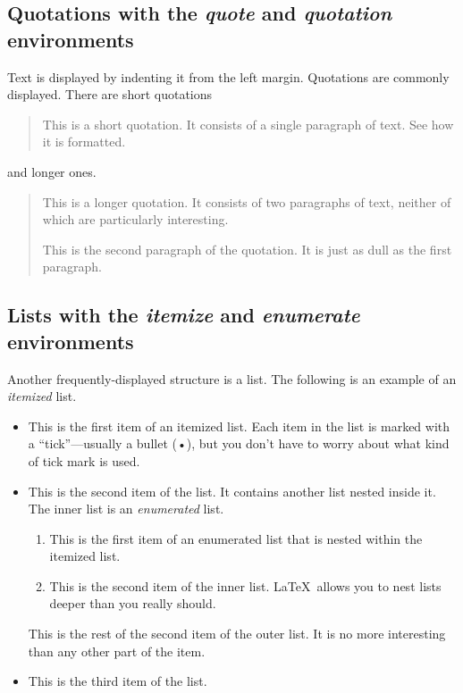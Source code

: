 \documentclass{article}      %
\begin{document}
\subsection{Quotations with the \emph{quote} and \emph{quotation} environments}

Text is displayed by indenting it from the left margin.  Quotations are commonly displayed.  There
are short quotations
\begin{quote}
   This is a short quotation.  It consists of a single paragraph of text.  See how it is formatted.
\end{quote}
and longer ones.
\begin{quotation}
   This is a longer quotation.  It consists of two paragraphs of text, neither of which are
   particularly interesting.

   This is the second paragraph of the quotation.  It is just as dull as the first paragraph.
\end{quotation}

\subsection{Lists with the \emph{itemize} and \emph{enumerate} environments}

Another frequently-displayed structure is a list. The following is an example of an 
\emph{itemized} list.

\begin{itemize}
   
   \item This is the first item of an itemized list. Each item in the list is marked with a
    ``tick''—usually a bullet (•), but you don't have to worry about what kind of tick mark is
    used.

   \item This is the second item of the list.  It contains another list nested inside it.  The inner
    list is an \emph{enumerated} list.
         \begin{enumerate}
            \item This is the first item of an enumerated list that is nested within the itemized
             list.

            \item This is the second item of the inner list. \LaTeX\ allows you to nest lists deeper
             than you really should.
         \end{enumerate}
         This is the rest of the second item of the outer list.  It is no more interesting than any
         other part of the item.
   
   \item This is the third item of the list.
\end{itemize}
\end{document}
